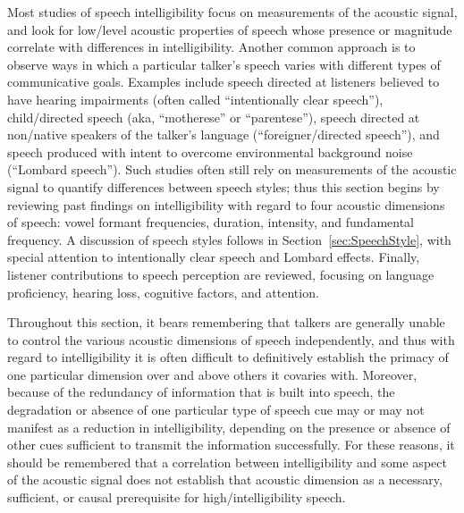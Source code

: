 Most studies of speech intelligibility focus on measurements of the acoustic signal, and look for low\-/level acoustic properties of speech whose presence or magnitude correlate with differences in intelligibility.  Another common approach is to observe ways in which a particular talker’s speech varies with different types of communicative goals.  Examples include speech directed at listeners believed to have hearing impairments (often called “intentionally clear speech”), child\-/directed speech (\ac{aka}, “motherese” or “parentese”), speech directed at non\-/native speakers of the talker’s language (“foreigner\-/directed speech”), and speech produced with intent to overcome environmental background noise (“Lombard speech”).  Such studies often still rely on measurements of the acoustic signal to quantify differences between speech styles; thus this section begins by reviewing past findings on intelligibility with regard to four acoustic dimensions of speech: vowel formant frequencies, duration, intensity, and fundamental frequency.  %
A discussion of speech styles follows in Section~\ref{sec:SpeechStyle}, with special attention to intentionally clear speech and Lombard effects.  Finally, listener contributions to speech perception are reviewed, focusing on language proficiency, hearing loss, cognitive factors, and attention.  

Throughout this section, it bears remembering that talkers are generally unable to control the various acoustic dimensions of speech independently, and thus with regard to intelligibility it is often difficult to definitively establish the primacy of one particular dimension over and above others it covaries with.  Moreover, because of the redundancy of information that is built into speech, the degradation or absence of one particular type of speech cue may or may not manifest as a reduction in intelligibility, depending on the presence or absence of other cues sufficient to transmit the information successfully.  For these reasons, it should be remembered that a correlation between intelligibility and some aspect of the acoustic signal does not establish that acoustic dimension as a necessary, sufficient, or causal prerequisite for high\-/intelligibility speech.     

